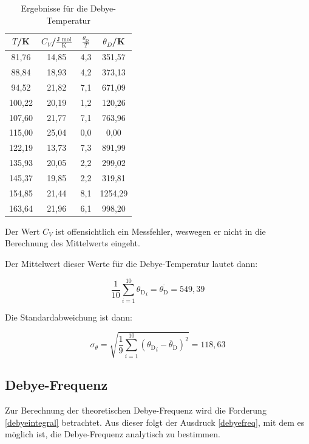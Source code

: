 \begin{table}[H]
	\begin{center}
		\begin{tabular}{c c c c}
			\toprule
			\(T\)/K & \(C_V\)/\(\frac{\text{J mol}}{\text{K}}\) & \(\frac{\theta_\text{D}}{T}\) & \(\theta_D\)/K \\
			\midrule
			81,76	&14,85	&4,3		&351,57\\
			88,84	&18,93	&4,2		&373,13\\
			94,52	&21,82	&7,1		&671,09\\
			100,22	&20,19	&1,2		&120,26\\
			107,60	&21,77	&7,1		&763,96\\
			115,00	&25,04	&0,0		&0,00\\
			122,19	&13,73	&7,3		&891,99\\
			135,93	&20,05	&2,2		&299,02\\
			145,37	&19,85	&2,2		&319,81\\
			154,85	&21,44	&8,1		&1254,29\\
			163,64	&21,96	&6,1		&998,20\\
			\bottomrule
		\end{tabular}
		\caption{Ergebnisse für die Debye-Temperatur}
		\label{fig:tab5}
	\end{center}
\end{table}

\noindent Der Wert \(C_V\) ist offensichtlich ein Messfehler, weswegen er nicht in die Berechnung des Mittelwerts eingeht.

\noindent Der Mittelwert dieser Werte für die Debye-Temperatur lautet dann:

\begin{equation}
\frac{1}{10}\sum\limits_{i=1}^{10}{\theta_{\text{D}}}_i=\overline{\theta_\text{D}}=549,39
\end{equation}

\noindent Die Standardabweichung ist dann:

\begin{equation}
\sigma_\theta=\sqrt{\frac{1}{9}\sum\limits_{i=1}^{10}({\theta_{\text{D}}}_i-\overline \theta_{\text{D}})^2}=118,63
\end{equation}

\subsection{Debye-Frequenz}
Zur Berechnung der theoretischen Debye-Frequenz wird die Forderung \eqref{debyeintegral} betrachtet. Aus dieser folgt der Ausdruck \eqref{debyefreq}, mit dem es möglich ist, die Debye-Frequenz analytisch zu bestimmen.

